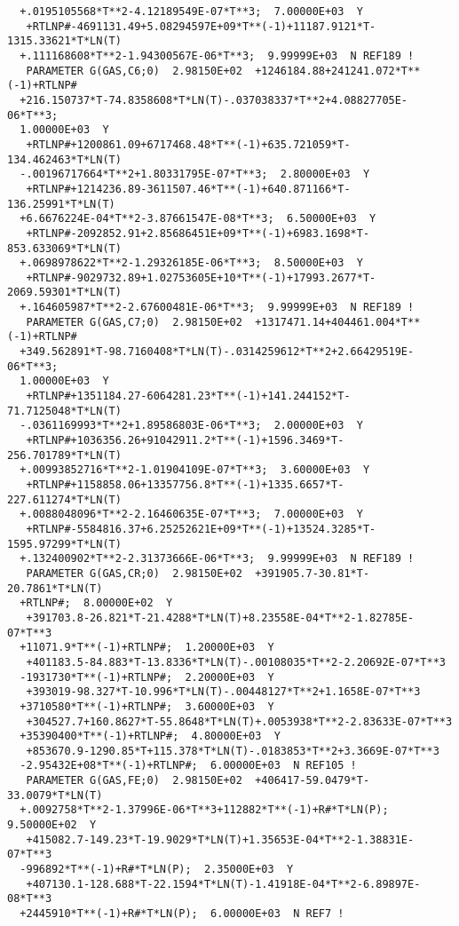 \documentclass[12pt]{article}
\begin{document}
\begin{verbatim}
  +.0195105568*T**2-4.12189549E-07*T**3;  7.00000E+03  Y
   +RTLNP#-4691131.49+5.08294597E+09*T**(-1)+11187.9121*T-1315.33621*T*LN(T)
  +.111168608*T**2-1.94300567E-06*T**3;  9.99999E+03  N REF189 !
   PARAMETER G(GAS,C6;0)  2.98150E+02  +1246184.88+241241.072*T**(-1)+RTLNP#
  +216.150737*T-74.8358608*T*LN(T)-.037038337*T**2+4.08827705E-06*T**3;  
  1.00000E+03  Y
   +RTLNP#+1200861.09+6717468.48*T**(-1)+635.721059*T-134.462463*T*LN(T)
  -.00196717664*T**2+1.80331795E-07*T**3;  2.80000E+03  Y
   +RTLNP#+1214236.89-3611507.46*T**(-1)+640.871166*T-136.25991*T*LN(T)
  +6.6676224E-04*T**2-3.87661547E-08*T**3;  6.50000E+03  Y
   +RTLNP#-2092852.91+2.85686451E+09*T**(-1)+6983.1698*T-853.633069*T*LN(T)
  +.0698978622*T**2-1.29326185E-06*T**3;  8.50000E+03  Y
   +RTLNP#-9029732.89+1.02753605E+10*T**(-1)+17993.2677*T-2069.59301*T*LN(T)
  +.164605987*T**2-2.67600481E-06*T**3;  9.99999E+03  N REF189 !
   PARAMETER G(GAS,C7;0)  2.98150E+02  +1317471.14+404461.004*T**(-1)+RTLNP#
  +349.562891*T-98.7160408*T*LN(T)-.0314259612*T**2+2.66429519E-06*T**3;  
  1.00000E+03  Y
   +RTLNP#+1351184.27-6064281.23*T**(-1)+141.244152*T-71.7125048*T*LN(T)
  -.0361169993*T**2+1.89586803E-06*T**3;  2.00000E+03  Y
   +RTLNP#+1036356.26+91042911.2*T**(-1)+1596.3469*T-256.701789*T*LN(T)
  +.00993852716*T**2-1.01904109E-07*T**3;  3.60000E+03  Y
   +RTLNP#+1158858.06+13357756.8*T**(-1)+1335.6657*T-227.611274*T*LN(T)
  +.0088048096*T**2-2.16460635E-07*T**3;  7.00000E+03  Y
   +RTLNP#-5584816.37+6.25252621E+09*T**(-1)+13524.3285*T-1595.97299*T*LN(T)
  +.132400902*T**2-2.31373666E-06*T**3;  9.99999E+03  N REF189 !
   PARAMETER G(GAS,CR;0)  2.98150E+02  +391905.7-30.81*T-20.7861*T*LN(T)
  +RTLNP#;  8.00000E+02  Y
   +391703.8-26.821*T-21.4288*T*LN(T)+8.23558E-04*T**2-1.82785E-07*T**3
  +11071.9*T**(-1)+RTLNP#;  1.20000E+03  Y
   +401183.5-84.883*T-13.8336*T*LN(T)-.00108035*T**2-2.20692E-07*T**3
  -1931730*T**(-1)+RTLNP#;  2.20000E+03  Y
   +393019-98.327*T-10.996*T*LN(T)-.00448127*T**2+1.1658E-07*T**3
  +3710580*T**(-1)+RTLNP#;  3.60000E+03  Y
   +304527.7+160.8627*T-55.8648*T*LN(T)+.0053938*T**2-2.83633E-07*T**3
  +35390400*T**(-1)+RTLNP#;  4.80000E+03  Y
   +853670.9-1290.85*T+115.378*T*LN(T)-.0183853*T**2+3.3669E-07*T**3
  -2.95432E+08*T**(-1)+RTLNP#;  6.00000E+03  N REF105 !
   PARAMETER G(GAS,FE;0)  2.98150E+02  +406417-59.0479*T-33.0079*T*LN(T)
  +.0092758*T**2-1.37996E-06*T**3+112882*T**(-1)+R#*T*LN(P);  9.50000E+02  Y
   +415082.7-149.23*T-19.9029*T*LN(T)+1.35653E-04*T**2-1.38831E-07*T**3
  -996892*T**(-1)+R#*T*LN(P);  2.35000E+03  Y
   +407130.1-128.688*T-22.1594*T*LN(T)-1.41918E-04*T**2-6.89897E-08*T**3
  +2445910*T**(-1)+R#*T*LN(P);  6.00000E+03  N REF7 !



\end{verbatim}
\end{document}
